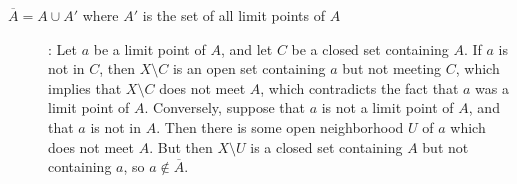 \documentclass[12pt]{article}
\begin{document}
\begin{description}
\item[$\overline{A} = A\cup A'$ where $A'$ is the set of all limit points of $A$]:
Let $a$ be a limit point of $A$, and let $C$ be a closed set containing $A$.  If $a$ is not in $C$, then $X\setminus C$ is an open set containing $a$ but not meeting $C$, which implies that $X\setminus C$ does not meet $A$, which contradicts the fact that $a$ was a limit point of $A$.  Conversely, suppose that $a$ is not a limit point of $A$, and that $a$ is not in $A$.  Then there is some open neighborhood $U$ of $a$ which does not meet $A$.  But then $X\setminus U$ is a closed set containing $A$ but not containing $a$, so $a\notin\overline{A}$. 

\end{description}
\end{document}
